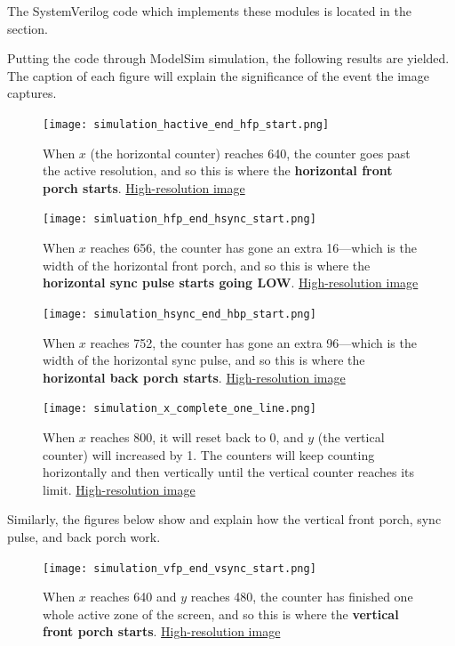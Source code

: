 \documentclass[12pt]{article}
\numberwithin{figure}{section}
\begin{document}
The SystemVerilog code which implements these modules is located in the  section.

Putting the code through ModelSim simulation, the following results are yielded. The caption of each figure will explain the significance of the event the image captures.

\newpage

\begin{figure}[ht]
  \centering
  \texttt{[image: simulation\_hactive\_end\_hfp\_start.png]}
  \caption{When $x$ (the horizontal counter) reaches 640, the counter goes past the active resolution, and so this is where the \textbf{horizontal front porch starts}. \href{https://i.imgur.com/QpwEYGF.jpg}{High-resolution image}}
\end{figure}

\begin{figure}[ht!]
  \centering
  \texttt{[image: simluation\_hfp\_end\_hsync\_start.png]}
  \caption{When $x$ reaches 656, the counter has gone an extra 16---which is the width of the horizontal front porch, and so this is where the \textbf{horizontal sync pulse starts going LOW}. \href{https://i.imgur.com/EfWxYUW.jpg}{High-resolution image}}
\end{figure}

\newpage

\begin{figure}[ht]
  \centering
  \texttt{[image: simulation\_hsync\_end\_hbp\_start.png]}
  \caption{When $x$ reaches 752, the counter has gone an extra 96---which is the width of the horizontal sync pulse, and so this is where the \textbf{horizontal back porch starts}. \href{https://i.imgur.com/IkwIol1.jpg}{High-resolution image}}
\end{figure}

\begin{figure}[ht!]
  \centering
  \texttt{[image: simulation\_x\_complete\_one\_line.png]}
  \caption{When $x$ reaches 800, it will reset back to 0, and $y$ (the vertical counter) will increased by 1. The counters will keep counting horizontally and then vertically until the vertical counter reaches its limit. \href{https://i.imgur.com/Tqamgkr.jpg}{High-resolution image}}
\end{figure}

Similarly, the figures below show and explain how the vertical front porch, sync pulse, and back porch work.

\newpage

\begin{figure}[ht]
  \centering
  \texttt{[image: simulation\_vfp\_end\_vsync\_start.png]}
  \caption{When $x$ reaches 640 and $y$ reaches 480, the counter has finished one whole active zone of the screen, and so this is where the \textbf{vertical front porch starts}. \href{https://i.imgur.com/aNPD7pG.jpg}{High-resolution image}}
\end{figure}
\end{document}
